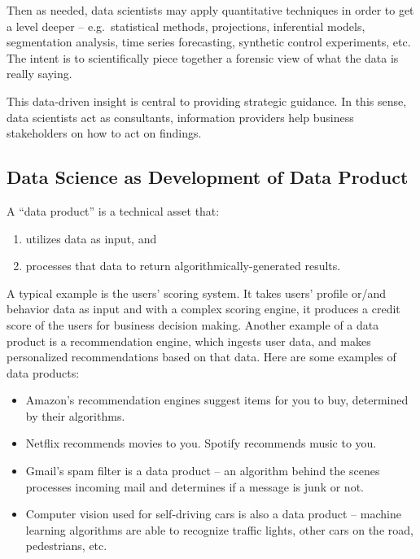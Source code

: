 \documentclass[
]{book}
\providecommand{\tightlist}{%
  \setlength{\itemsep}{0pt}\setlength{\parskip}{0pt}}
\begin{document}
Then as needed, data scientists may apply quantitative techniques in order to get a level deeper -- e.g.~statistical methods, projections, inferential models, segmentation analysis, time series forecasting, synthetic control experiments, etc. The intent is to scientifically piece together a forensic view of what the data is really saying.

This data-driven insight is central to providing strategic guidance. In this sense, data scientists act as consultants, information providers help business stakeholders on how to act on findings.

\hypertarget{data-science-as-development-of-data-product}{%
\subsection*{Data Science as Development of Data Product}\label{data-science-as-development-of-data-product}}


A ``data product'' is a technical asset that:

\begin{enumerate}
\def\labelenumi{\arabic{enumi}.}
\tightlist
\item
  utilizes data as input, and
\item
  processes that data to return algorithmically-generated results.
\end{enumerate}

A typical example is the users' scoring system. It takes users' profile or/and behavior data as input and with a complex scoring engine, it produces a credit score of the users for business decision making.
Another example of a data product is a recommendation engine, which ingests user data, and makes personalized recommendations based on that data.
Here are some examples of data products:

\begin{itemize}
\tightlist
\item
  Amazon's recommendation engines suggest items for you to buy, determined by their algorithms.
\item
  Netflix recommends movies to you. Spotify recommends music to you.
\item
  Gmail's spam filter is a data product -- an algorithm behind the scenes processes incoming mail and determines if a message is junk or not.
\item
  Computer vision used for self-driving cars is also a data product -- machine learning algorithms are able to recognize traffic lights, other cars on the road, pedestrians, etc.
\end{itemize}
\end{document}
